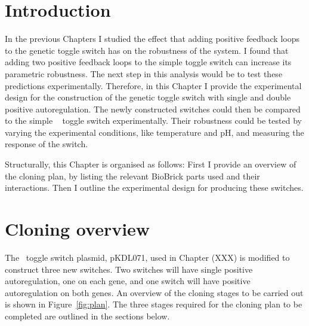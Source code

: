 
\section{Introduction}

In the previous Chapters I studied the effect that adding positive feedback loops to the genetic toggle switch has on the robustness of the system. I found that adding two positive feedback loops to the simple toggle switch can increase its parametric robustness. The next step in this analysis would be to test these predictions experimentally. Therefore, in this Chapter I provide the experimental design for the construction of the genetic toggle switch with single and double positive autoregulation. The newly constructed switches could then be compared to the simple ~\textcite{Litcofsky:2012gr} toggle switch experimentally. Their robustness could be tested by varying the experimental conditions, like temperature and pH, and measuring the response of the switch.

Structurally, this Chapter is organised as follows: First I provide an overview of the cloning plan, by listing the relevant BioBrick parts used and their interactions. Then I outline the experimental design for producing these switches.


\section{Cloning overview}

The~\textcite{Litcofsky:2012gr} toggle switch plasmid, pKDL071, used in Chapter (XXX) is modified to construct three new switches. Two switches will have single positive autoregulation, one on each gene, and one switch will have positive autoregulation on both genes. An overview of the cloning stages to be carried out is shown in Figure~\ref{fig:plan}. The three stages required for the cloning plan to be completed are outlined in the sections below. 

